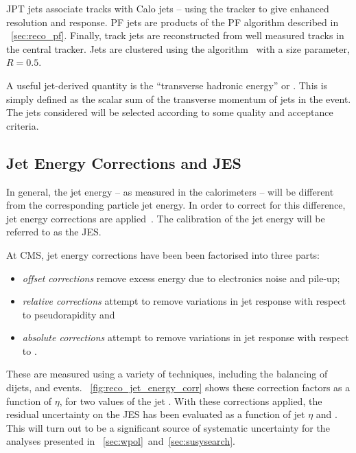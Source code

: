 \ac{JPT} jets associate tracks with \ac{Calo} jets -- using the tracker to give
enhanced \Pt resolution and response. \ac{PF} jets are products of the \acl{PF}
algorithm described in \sec~\ref{sec:reco_pf}. Finally, track jets are
reconstructed from well measured tracks in the central tracker. Jets are
clustered using the \antiKT algorithm~\cite{antiKT} with a size parameter,
$R=0.5$.

A useful jet-derived quantity is the ``transverse hadronic energy'' or \HT. This
is simply defined as the scalar sum of the transverse momentum of jets in the
event. The jets considered will be selected according to some quality and
acceptance criteria.

\subsection{Jet Energy Corrections and \acl{JES}}
In general, the jet energy -- as measured in the calorimeters -- will be
different from the corresponding particle jet energy. In order to correct for
this difference, jet energy corrections are
applied~\cite{jet_energy_cms,jet_energy_pas}. The calibration of the jet energy
will be referred to as the \acf{JES}.

At \ac{CMS}, jet energy corrections have been been factorised into three parts:
\begin{itemize}
\item \emph{offset corrections} remove excess energy due to electronics noise
  and pile-up;
\item \emph{relative corrections} attempt to remove variations in jet response
  with respect to pseudorapidity and
\item \emph{absolute corrections} attempt to remove variations in jet response
  with respect to \Pt.
\end{itemize}

These are measured using a variety of techniques, including the balancing of
dijets, \gammajets and \Zjets events. \fig~\ref{fig:reco_jet_energy_corr} shows
these correction factors as a function of $\eta$, for two values of the jet
\Pt. With these corrections applied, the residual uncertainty on the \ac{JES}
has been evaluated as a function of jet $\eta$ and \Pt. This will turn out to be
a significant source of systematic uncertainty for the analyses presented in
\chaps~\ref{sec:wpol}~and~\ref{sec:susysearch}.

